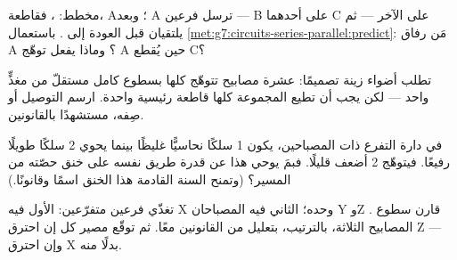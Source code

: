 \begin{exercise}[$\star\star$]\label{exo:g7:circuits-series-parallel:9}
مخطط: ، فقاطعة،  A؛ وبعد A ترسل  فرعين ---
 B على أحدهما  C على الآخر --- ثم يلتقيان قبل
العودة إلى . باستعمال
\cref{met:g7:circuits-series-parallel:predict}: مَن رفاق A ؟ وماذا يفعل توهّج A حين يُقطع  C؟
\end{exercise}

\begin{exercise}[$\star\star$]\label{exo:g7:circuits-series-parallel:10}
تطلب أضواء زينة تصميمًا: عشرة مصابيح تتوهّج كلها بسطوع كامل
مستقلّ من مغذٍّ واحد --- لكن يجب أن تطيع المجموعة كلها قاطعة
رئيسية واحدة. ارسم التوصيل أو صِفه، مستشهدًا بالقانونين.
\end{exercise}

\begin{exercise}[$\star\star$]\label{exo:g7:circuits-series-parallel:11}
في دارة التفرع ذات المصباحين، يكون   1 سلكًا نحاسيًّا
غليظًا بينما يحوي   2 سلكًا طويلًا رفيعًا. فيتوهّج
 2 أضعف قليلًا. فبمَ يوحي هذا عن قدرة طريق  نفسه
على خنق حصّته من المسير؟ (وتمنح السنة القادمة هذا الخنق اسمًا
وقانونًا.)
\end{exercise}

\begin{exercise}[$\star\star\star$]\label{exo:g7:circuits-series-parallel:12}
 تغذّي فرعين متفرّعين:  الأول فيه  X وحده؛
 الثاني فيه المصباحان Y وZ . قارن سطوع
المصابيح الثلاثة، بالترتيب، بتعليل من القانونين معًا. ثم توقّع
مصير كل  إن احترق Z --- وإن احترق X بدلًا منه.
\end{exercise}

